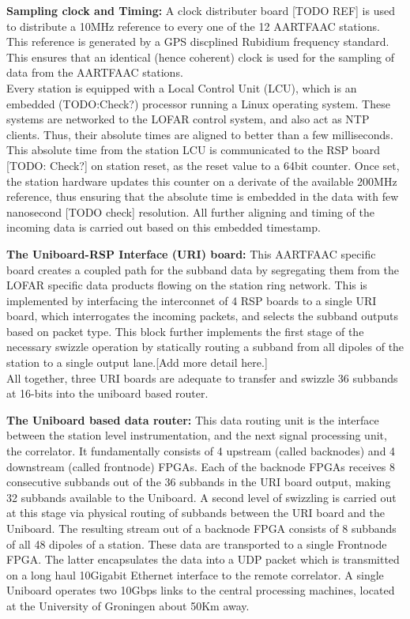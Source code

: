 \documentclass{ws-jai}
\begin{document}
\textbf {Sampling  clock and Timing:}  A clock  distributer board [TODO  REF] is
used  to  distribute  a  10MHz  reference  to  every  one  of  the  12  AARTFAAC
stations. This  reference is  generated by a  GPS discplined  Rubidium frequency
standard. This ensures that an identical  (hence coherent) clock is used for the
sampling of data from the AARTFAAC stations.\\

Every station is equipped with a Local  Control Unit (LCU), which is an embedded
(TODO:Check?)  processor  running a Linux  operating system.  These  systems are
networked to the LOFAR control system, and  also act as NTP clients. Thus, their
absolute times are aligned to better than a few milliseconds. This absolute time
from the station LCU is communicated to  the RSP board [TODO: Check?] on station
reset, as the  reset value to a  64bit counter.  Once set,  the station hardware
updates  this counter  on a  derivate of  the available  200MHz reference,  thus
ensuring that  the absolute  time is  embedded in the  data with  few nanosecond
[TODO check] resolution. All further aligning and timing of the incoming data is
carried out based on this embedded timestamp.

\textbf {The Uniboard-RSP  Interface (URI) board:} This  AARTFAAC specific board
creates a coupled path  for the subband data by segregating  them from the LOFAR
specific data products flowing on the  station ring network. This is implemented
by interfacing  the interconnet  of 4 RSP  boards to a  single URI  board, which
interrogates  the incoming  packets, and  selects the  subband outputs  based on
packet type.  This block  further implements  the first  stage of  the necessary
swizzle  operation by  statically  routing a  subband from  all  dipoles of  the
station to a single output lane.[Add more detail here.]\\

All together, three URI boards are  adequate to transfer and swizzle 36 subbands
at 16-bits into the uniboard based router.

\textbf  {The  Uniboard based  data  router:}  This  data  routing unit  is  the
interface  between  the  station  level instrumentation,  and  the  next  signal
processing unit, the correlator. It fundamentally consists of 4 upstream (called
backnodes) and 4 downstream (called frontnode) FPGAs. Each of the backnode FPGAs
receives 8 consecutive subbands out of the  36 subbands in the URI board output,
making 32  subbands available to  the Uniboard. A  second level of  swizzling is
carried out at this stage via physical routing of subbands between the URI board
and the  Uniboard. The  resulting stream out  of a backnode  FPGA consists  of 8
subbands of all 48 dipoles of a  station. These data are transported to a single
Frontnode FPGA.   The latter encapsulates  the data into  a UDP packet  which is
transmitted  on  a  long  haul   10Gigabit  Ethernet  interface  to  the  remote
correlator.  A  single  Uniboard  operates  two  10Gbps  links  to  the  central
processing machines, located at the University of Groningen about 50Km away.
\end{document}
